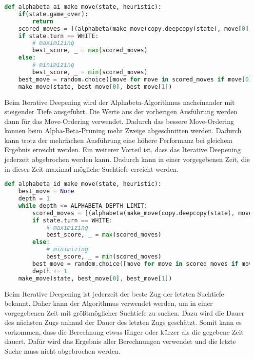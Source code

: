 \begin{lstlisting}[language=Python]
def alphabeta_ai_make_move(state, heuristic):
    if(state.game_over):
        return
    scored_moves = [(alphabeta(make_move(copy.deepcopy(state), move[0], move[1]), ALPHABETA_DEPTH_LIMIT-1, -math.inf, math.inf, heuristic), move) for move in state.possible_moves]
    if state.turn == WHITE:
        # maximizing
        best_score, _ = max(scored_moves)
    else:
        # minimizing
        best_score, _ = min(scored_moves)
    best_move = random.choice([move for move in scored_moves if move[0] == best_score])[1]
    make_move(state, best_move[0], best_move[1])
\end{lstlisting}

Beim Iterative Deepening wird der Alphabeta-Algorithmus nacheinander mit
steigender Tiefe ausgeführt. Die Werte aus der vorherigen Ausführung
werden dann für das Move-Ordering verwendet. Dadurch das bessere
Move-Ordering können beim Alpha-Beta-Pruning mehr Zweige abgeschnitten
werden. Dadurch kann trotz der mehrfachen Ausführung eine höhere
Performanz bei gleichem Ergebnis erreicht werden. Ein weiterer Vorteil
ist, dass das Iterative Deepening jederzeit abgebrochen werden kann.
Dadurch kann in einer vorgegebenen Zeit, die in dieser Zeit maximal
mögliche Suchtiefe erreicht werden.

\begin{lstlisting}[language=Python]
def alphabeta_id_make_move(state, heuristic):
    best_move = None
    depth = 1
    while depth <= ALPHABETA_DEPTH_LIMIT:
        scored_moves = [(alphabeta(make_move(copy.deepcopy(state), move[0], move[1]), depth-1, -math.inf, math.inf, heuristic), move) for move in state.possible_moves]
        if state.turn == WHITE:
            # maximizing
            best_score, _ = max(scored_moves)
        else:
            # minimizing
            best_score, _ = min(scored_moves)
        best_move = random.choice([move for move in scored_moves if move[0] == best_score])[1]
        depth += 1
    make_move(state, best_move[0], best_move[1])
\end{lstlisting}

Beim Iterative Deepening ist jederzeit der beste Zug der letzten
Suchtiefe bekannt. Daher kann der Algorithmus verwendet werden, um in
einer vorgegebenen Zeit mit größtmöglicher Suchtiefe zu suchen. Dazu
wird die Dauer des nächsten Zugs anhand der Dauer des letzten Zugs
geschätzt. Somit kann es vorkommen, dass die Berechnung etwas länger
oder kürzer als die gegebene Zeit dauert. Dafür wird das Ergebnis aller
Berechnungen verwendet und die letzte Suche muss nicht abgebrochen
werden.

